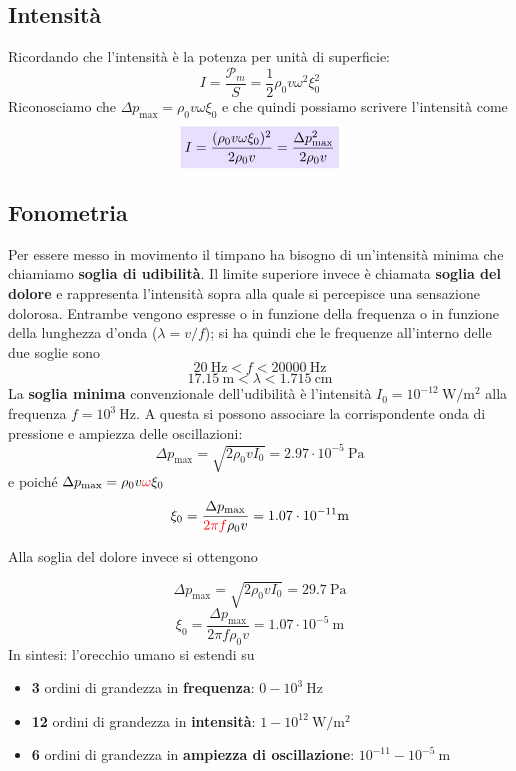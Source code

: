 \documentclass[x11names]{report}
\newcommand{\viola}[1]{\colorbox{yred}{$\displaystyle #1$}}
\begin{document}
	\subsection{Intensità}
	Ricordando che l'intensità è la potenza per unità di superficie:
	\[ 
	I = \frac{\mathcal{P}_m }{S} =   \frac{1}{2} \rho_0 v \omega ^2 \xi_0^2
	\]
	Riconosciamo che \(\Delta p_{\text{max}} = \rho_0 v \omega  \xi_0\) e che quindi possiamo scrivere l'intensità come
	\begin{equation}\label{intensita_fono}
		\viola{I = \frac{(\rho_0 v \omega  \xi_0)^2}{2\rho_0 v} = \frac{\Delta p_{\text{max}}^2}{2\rho_0 v}}
	\end{equation}
	
	
	\subsection{Fonometria}
	Per essere messo in movimento il timpano ha bisogno di un'intensità minima che chiamiamo \textbf{soglia di udibilità}. Il limite superiore invece è chiamata \textbf{soglia del dolore} e rappresenta l'intensità sopra alla quale si percepisce una sensazione dolorosa. Entrambe vengono espresse o in funzione della frequenza o in funzione della lunghezza d'onda (\(\lambda=v/f\)); si ha quindi che le frequenze all'interno delle due soglie sono
	\[ 
		\SI{20}{\hertz} < f < \SI{20000}{\hertz}
	\]
	\[ 
		\SI{17.15}{\m} < \lambda < \SI{1.715}{\cm}
	\]
	La\textbf{ soglia minima} convenzionale dell'udibilità è l'intensità \(I_0 = 10^{-12}\SI{}{\watt/\m^2}\) alla frequenza  \(f = 10^3\SI{}{\hertz}\). A questa si possono associare la corrispondente onda di pressione e ampiezza delle oscillazioni:
	\[ 
		\Delta p_{\text{max}} = \sqrt{2\rho_0 v I_0} = 2.97 \cdot 10^{-5} \SI{}{\pascal}
	\]
	e poiché  \(\Delta p_{\text{max}} = \rho_0 v \textcolor{red}{\omega } \xi_0\)
	\[ 
		\xi_0 = \frac{\Delta p_{\text{max}}}{\textcolor{red}{2\pi f}\rho_0 v} = 1.07 \cdot 10^{-11}\SI{}{\m}
	\]
	
	Alla soglia del dolore invece si ottengono 
	
	\[ 
	\Delta p_{\text{max}} = \sqrt{2\rho_0 v I_0} = 29.7 \SI{}{\pascal}
	\]
	\[ 
	\xi_0 = \frac{\Delta p_{\text{max}}}{2\pi f\rho_0 v} = 1.07 \cdot 10^{-5}\SI{}{\m}
	\]
	In sintesi: l'orecchio umano si estendi su
	\begin{itemize}
		\item \textbf{3} ordini di grandezza in \textbf{frequenza}: \(0 - 10^3 \SI{}{\hertz}\)
		\item \textbf{12} ordini di grandezza in \textbf{intensità}: \(1 - 10^12 \SI{}{\watt/\m^2}\)
		\item \textbf{6} ordini di grandezza in \textbf{ampiezza di oscillazione}: \(10^{-11} - 10^{-5} \SI{}{\m}\)
	\end{itemize}
	
\end{document}

